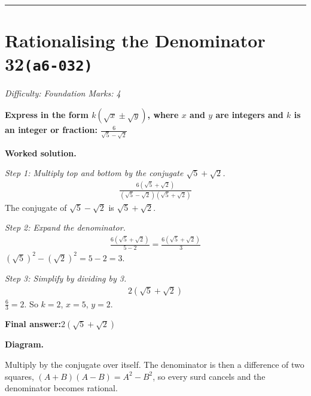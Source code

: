 \documentclass[11pt]{article}
\newcommand{\question}[1]{\par\medskip\noindent\textbf{#1}\par}
\begin{document}
\medskip\hrule

\section*{Rationalising the Denominator 32\quad\small\texttt{(a6-032)}}
\textit{Difficulty: Foundation \quad\textbar\quad Marks: 4}

\question{Express in the form \( k(\sqrt{x} \pm \sqrt{y}) \), where \( x \) and \( y \) are integers and \( k \) is an integer or fraction: \( \frac{6}{\sqrt{5} - \sqrt{2}} \)}

\textbf{Worked solution.}

\textit{Step 1: Multiply top and bottom by the conjugate \( \sqrt{5} + \sqrt{2} \).}
\[\begin{gathered}
\frac{6(\sqrt{5} + \sqrt{2})}{(\sqrt{5} - \sqrt{2})(\sqrt{5} + \sqrt{2})}
\end{gathered}\]
The conjugate of \( \sqrt{5} - \sqrt{2} \) is \( \sqrt{5} + \sqrt{2} \).

\textit{Step 2: Expand the denominator.}
\[\begin{gathered}
\frac{6(\sqrt{5} + \sqrt{2})}{5 - 2} = \frac{6(\sqrt{5} + \sqrt{2})}{3}
\end{gathered}\]
\( (\sqrt{5})^2 - (\sqrt{2})^2 = 5 - 2 = 3 \).

\textit{Step 3: Simplify by dividing by 3.}
\[\begin{gathered}
2(\sqrt{5} + \sqrt{2})
\end{gathered}\]
\( \frac{6}{3} = 2 \). So \( k = 2 \), \( x = 5 \), \( y = 2 \).

\begin{answerbox}
\textbf{Final answer:}\quad \(\displaystyle 2(\sqrt{5} + \sqrt{2})\)
\end{answerbox}
\textbf{Diagram.}

\begin{center}
\end{center}
\small Multiply by the conjugate over itself. The denominator is then a difference of two squares, $(A+B)(A-B)=A^{2}-B^{2}$, so every surd cancels and the denominator becomes rational.\normalsize
\end{document}
